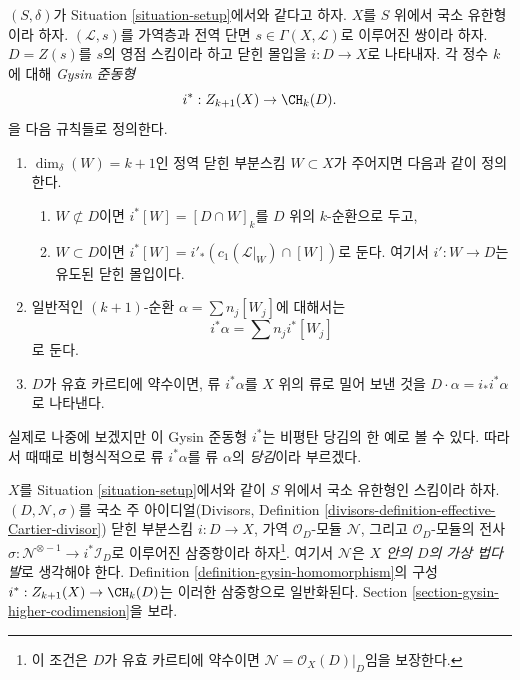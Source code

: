 \begin{definition}
\label{definition-gysin-homomorphism}
$(S, \delta)$가 Situation \ref{situation-setup}에서와 같다고 하자.
$X$를 $S$ 위에서 국소 유한형이라 하자. $(\mathcal{L}, s)$를 가역층과
전역 단면 $s \in \Gamma(X, \mathcal{L})$로 이루어진 쌍이라 하자.
$D = Z(s)$를 $s$의 영점 스킴이라 하고 닫힌 몰입을
$i : D \to X$로 나타내자. 각 정수 $k$에 대해 {\it Gysin 준동형}
$$
i^* : Z_{k + 1}(X) \to \CH_k(D).
$$
을 다음 규칙들로 정의한다.
\begin{enumerate}
\item $\dim_\delta(W) = k + 1$인 정역 닫힌 부분스킴 $W \subset X$가
주어지면 다음과 같이 정의한다.
\begin{enumerate}
\item $W \not \subset D$이면 $i^*[W] = [D \cap W]_k$를 $D$ 위의
$k$-순환으로 두고,
\item $W \subset D$이면
$i^*[W] = i'_*(c_1(\mathcal{L}|_W) \cap [W])$로 둔다. 여기서
$i' : W \to D$는 유도된 닫힌 몰입이다.
\end{enumerate}
\item 일반적인 $(k + 1)$-순환 $\alpha = \sum n_j[W_j]$에 대해서는
$$
i^*\alpha = \sum n_j i^*[W_j]
$$
로 둔다.
\item $D$가 유효 카르티에 약수이면, 류 $i^*\alpha$를 $X$ 위의 류로
밀어 보낸 것을 $D \cdot \alpha = i_*i^*\alpha$로 나타낸다.
\end{enumerate}
\end{definition}

\noindent
실제로 나중에 보겠지만 이 Gysin 준동형 $i^*$는 비평탄 당김의 한
예로 볼 수 있다. 따라서 때때로 비형식적으로 류 $i^*\alpha$를 류
$\alpha$의 {\it 당김}이라 부르겠다.

\begin{remark}
\label{remark-generalize-to-virtual}
$X$를 Situation \ref{situation-setup}에서와 같이 $S$ 위에서 국소 유한형인
스킴이라 하자. $(D, \mathcal{N}, \sigma)$를 국소 주 아이디얼(Divisors,
Definition \ref{divisors-definition-effective-Cartier-divisor}) 닫힌 부분스킴
$i : D \to X$, 가역 $\mathcal{O}_D$-모듈 $\mathcal{N}$, 그리고
$\mathcal{O}_D$-모듈의 전사
$\sigma : \mathcal{N}^{\otimes -1} \to i^*\mathcal{I}_D$로 이루어진
삼중항이라 하자\footnote{이 조건은 $D$가 유효 카르티에 약수이면
$\mathcal{N} = \mathcal{O}_X(D)|_D$임을 보장한다.}. 여기서
$\mathcal{N}$은 {\it $X$ 안의 $D$의 가상 법다발}로 생각해야 한다.
Definition \ref{definition-gysin-homomorphism}의 구성
$i^* : Z_{k + 1}(X) \to \CH_k(D)$는 이러한 삼중항으로 일반화된다.
Section \ref{section-gysin-higher-codimension}을 보라.
\end{remark}

